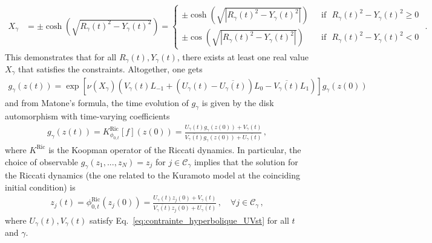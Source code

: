 \documentclass[aps,pre,reprint,longbibliography,superscriptaddress,noshowpacs,floatfix]{revtex4-2}
\theoremstyle{definition}
\theoremstyle{remark}
\begin{document}
\begin{align*}
    X_{\gamma} &= \pm \cosh(\sqrt{R_{\gamma}(t)^2 - Y_{\gamma}(t)^2}) = \left\{
\begin{aligned}
    \pm\cosh(\sqrt{|R_{\gamma}(t)^2 - Y_{\gamma}(t)^2|}) &\,\,\text{ if }\,\, R_{\gamma}(t)^2 - Y_{\gamma}(t)^2  \geq 0 \\
    \pm \cos(\sqrt{|R_{\gamma}(t)^2 - Y_{\gamma}(t)^2|}) &\,\,\text{ if }\,\,R_{\gamma}(t)^2 - Y_{\gamma}(t)^2  < 0
\end{aligned}
\right. \,\,.
\end{align*}
This demonstrates that for all $R_{\gamma}(t), Y_{\gamma}(t)$, there exists at least one real value $X_{\gamma}$ that satisfies the constraints. %
Altogether, one gets 
\begin{align*}
    g_{\gamma}(z(t)) = \exp[\nu(X_{\gamma})(V_{\gamma}(t)L_{-1} + (U_{\gamma}(t) - \overline{U_{\gamma}(t)})L_0 - \overline{V_{\gamma}(t)}L_1)]g_{\gamma}(z(0))
\end{align*}
and from Matone's formula, the time evolution of $g_{\gamma}$ is given by the disk automorphism with time-varying coefficients
\begin{align*}
    g_{\gamma}(z(t)) = K_{\phi_{0, t}}^{\mathrm{Ric}}[f](z(0)) = \frac{U_{\gamma}(t)g_{\gamma}(z(0)) + V_{\gamma}(t)}{\overline{V_{\gamma}(t)}g_{\gamma}(z(0)) + \overline{U_{\gamma}(t)}}\,,
\end{align*}
where $K^{\mathrm{Ric}}$ is the Koopman operator of the Riccati dynamics. In particular, the choice of observable $g_\gamma(z_1,...,z_N) = z_j$ for $j\in \mathcal{C}_\gamma$ implies that the solution for the Riccati dynamics (the one related to the Kuramoto model at the coinciding initial condition) is 
\begin{align}\label{eq:sol_gen_ricSI}
    z_j(t) = \phi_{0,t}^{\mathrm{Ric}}(z_j(0)) = \frac{U_{\gamma}(t)z_j(0) + V_{\gamma}(t)}{\overline{V_{\gamma}(t)}z_j(0) + \overline{U_{\gamma}(t)}}\,,\quad \forall j\in \mathcal{C}_\gamma\,,
\end{align}
where %
$U_{\gamma}(t), V_{\gamma}(t)$ satisfy Eq.~\eqref{eq:contrainte_hyperbolique_UVst} for all $t$ and $\gamma$. 
\end{document}
